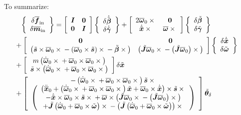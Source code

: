 \documentclass[10pt,fleqn,subeqn]{report}
\newcommand{\T}[1]{\bm{#1}}
\newcommand{\TT}[1]{\bm{#1}}
\begin{document}
To summarize:
\begin{align}
	\cubr{\cvvect{
		\delta\overline{\T{f}}_{\text{in}} \\
		\delta\overline{\T{m}}_{\text{in}}
	}} &= \sqbr{\matr{cc}{
		\TT{I} & \TT{0} \\
		\TT{0} & \TT{I}
	}} \cubr{\cvvect{
		\delta\dot{\tilde{\T{\beta}}} \\
		\delta\dot{\tilde{\T{\gamma}}}
	}} + \sqbr{\matr{cc}{
		2 \overline{\T{\omega}}_0 \times{} & \TT{0} \\
		\dot{\tilde{\T{x}}} \times{} & \overline{\T{\omega}} \times{}
	}} \cubr{\cvvect{
		\delta\tilde{\T{\beta}} \\
		\delta\tilde{\T{\gamma}}
	}}
	\nonumber \\ & \hspace{-20mm}
	+ \sqbr{\matr{cc}{
		\TT{0} & \TT{0} \\
		\plbr{
			\tilde{\T{s}} \times \overline{\T{\omega}}_0 \times{}
			- \plbr{\overline{\T{\omega}}_0 \times \tilde{\T{s}}} \times{}
			- \tilde{\T{\beta}} \times{}
		}
		& \plbr{
			\tilde{\TT{J}} \overline{\T{\omega}}_0 \times{}
			- \plbr{\tilde{\TT{J}} \overline{\T{\omega}}_0} \times{}
		}
	}} \cubr{\cvvect{
		\delta\dot{\tilde{\T{x}}} \\
		\delta\tilde{\T{\omega}}
	}}
	\nonumber \\ & \hspace{-20mm}
	+ \sqbr{\matr{c}{
		m \plbr{
			\dot{\overline{\T{\omega}}}_0 \times{}
			+ \overline{\T{\omega}}_0 \times \overline{\T{\omega}}_0 \times{}
		} \\
		\tilde{\T{s}} \times \plbr{
			\dot{\overline{\T{\omega}}}_0 \times{}
			+ \overline{\T{\omega}}_0 \times \overline{\T{\omega}}_0 \times{}
		}
	}} \delta\tilde{\T{x}}
	\nonumber \\ & \hspace{-20mm}
	+ \sqbr{\matr{c}{
		- \plbr{
			\dot{\overline{\T{\omega}}}_0 \times{}
			+ \overline{\T{\omega}}_0 \times \overline{\T{\omega}}_0 \times{}
		} \tilde{\T{s}} \times{} \\
		\plbr{\cvvect{
			\plbr{
				\ddot{\overline{\T{x}}}_0
				+ \plbr{
					\dot{\overline{\T{\omega}}}_0 \times{}
					+ \overline{\T{\omega}}_0 \times \overline{\T{\omega}}_0 \times{}
				} \tilde{\T{x}}
				+ \overline{\T{\omega}}_0 \times \dot{\tilde{\T{x}}}
			} \times \tilde{\T{s}} \times{} \\
			- \dot{\tilde{\T{x}}} \times \overline{\T{\omega}}_0 \times \tilde{\T{s}} \times{}
			+ \overline{\T{\omega}} \times \plbr{
				\tilde{\TT{J}} \overline{\T{\omega}}_0 \times{}
				- \plbr{\tilde{\TT{J}} \overline{\T{\omega}}_0} \times{}
			} \\
			+ \tilde{\TT{J}} \plbr{
				\dot{\overline{\T{\omega}}}_0
				+ \overline{\T{\omega}}_0 \times \tilde{\T{\omega}}
			} \times{}
			- \plbr{\tilde{\TT{J}} \plbr{
				\dot{\overline{\T{\omega}}}_0
				+ \overline{\T{\omega}}_0 \times \tilde{\T{\omega}}
			}} \times{}
		}}
	}} \tilde{\T{\theta}}_{\delta}
\end{align}
\end{document}
